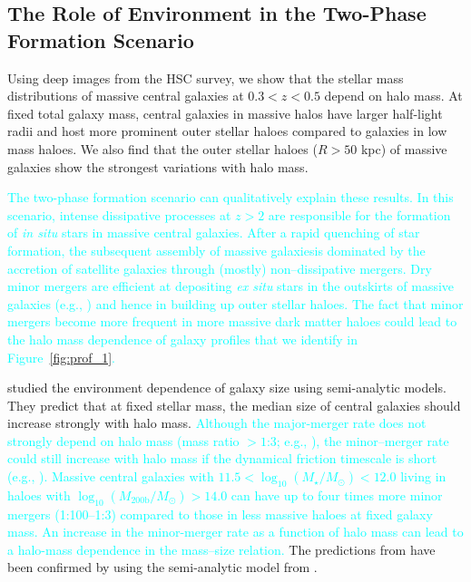 \documentclass[a4paper,fleqn,usenatbib]{mnras}
\def\logms{{$\log_{10} (M_{\star}/M_{\odot})$}}
\def\logmh{{$\log_{10} (M_{\mathrm{200b}}/M_{\odot})$}}
\newcommand{\song}[1]{\textcolor{cyan}{#1}}
\begin{document}
\subsection{The Role of Environment in the Two-Phase Formation Scenario}
            
    Using deep images from the HSC survey, we show that the stellar mass distributions 
    of massive central galaxies at $0.3 < z < 0.5$ depend on halo mass. At fixed total galaxy mass, central galaxies in massive halos have larger half-light radii and host more prominent outer 
    stellar haloes compared to galaxies in low mass haloes. We also find that 
    the outer stellar haloes ($R>50$ kpc) of massive galaxies show the strongest 
    variations with halo mass. 
    
    \song{
    The two-phase formation scenario can qualitatively explain these results. 
    In this scenario, intense dissipative processes at $z > 2$ are responsible for the 
    formation of \textit{in situ} stars in massive central galaxies. 
    After a rapid quenching of star formation, the subsequent assembly of massive galaxiesis  dominated by the accretion of satellite galaxies through (mostly) 
    non--dissipative mergers. 
    Dry minor mergers are efficient at depositing \textit{ex situ} stars in the 
    outskirts of massive galaxies (e.g., \citealt{Oogi2013, Bedorf2013}) and hence in building up outer stellar haloes. The fact that minor mergers become more frequent in more massive dark matter haloes could lead to the halo mass dependence of galaxy profiles that we identify in Figure~\ref{fig:prof_1}.}
      
    \citet{Shankar2014} studied the environment dependence of galaxy size using semi-analytic models. 
    They predict that at fixed stellar mass, the median size of central galaxies 
    should increase strongly with halo mass. 
    \song{
    Although the major-merger rate does not strongly depend on halo mass 
    (mass ratio $>1$:3; e.g., \citealt{Hirschmann2013, Shankar2015}), the 
    minor--merger rate could still increase with halo mass if the dynamical friction
    timescale is short (e.g., \citealt{Newman2012}). Massive central galaxies with $11.5 <$\logms{}$<12.0$ living in haloes with \logmh{}$>14.0$ can have up to four times more minor mergers (1:100--1:3) compared to those in less massive haloes at fixed galaxy mass. An increase in the minor-merger rate as a function of halo mass can lead to a 
    halo-mass dependence in the mass--size relation. 
    }
    The predictions from \citet{Shankar2014} have been confirmed by \citet{Yoon2017} 
    using the semi-analytic model from \citet{Guo2011}.  
    
\end{document}
